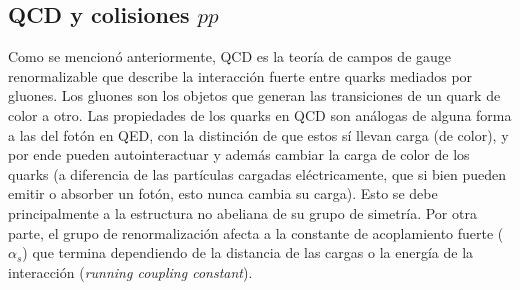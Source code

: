 



\subsection{QCD y colisiones $pp$}\label{sec:qcd_pp}

Como se mencionó anteriormente, QCD \cite{qcd_collider, tesis_martin} es la teoría de campos de gauge renormalizable
que describe la interacción fuerte entre quarks mediados por gluones. Los gluones son los objetos que generan las transiciones de un quark de color a otro. Las propiedades de los quarks en QCD son análogas de alguna forma a las del fotón en QED, con la distinción de que estos sí llevan carga (de color), y por ende pueden autointeractuar y además cambiar la carga  de color de los quarks (a diferencia de las partículas cargadas eléctricamente, que si bien pueden emitir o absorber un fotón, esto nunca cambia su carga). Esto se debe principalmente a la estructura no abeliana de su grupo de simetría.
Por otra parte, el grupo de renormalización afecta a la constante de acoplamiento fuerte ($\alpha_s$) que termina dependiendo de la distancia de las cargas o la energía de la interacción (\textit{running coupling constant}). 

